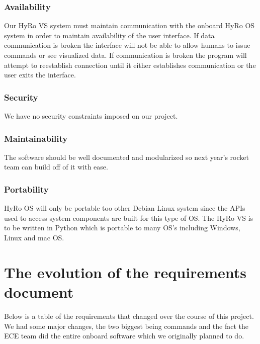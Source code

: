 \documentclass[10pt,draftclsnofoot,onecolumn,retainorgcmds]{IEEEtran}
\begin{document}
\subsubsection{Availability}
Our HyRo VS system must maintain communication with the onboard HyRo OS system in order to maintain availability of the user interface. If data communication is broken the interface will not be able to allow humans to issue commands or see visualized data. If communication is broken the program will attempt to reestablish connection until it either establishes communication or the user exits the interface.

\subsubsection{Security}
We have no security constraints imposed on our project.
\subsubsection{Maintainability} The software should be well documented and modularized so next year's rocket team can build off of it with ease.
\subsubsection{Portability} HyRo OS will only be portable too other Debian Linux system since the APIs used to access system components are built for this type of OS. The HyRo VS is to be written in Python which is portable to many OS's including Windows, Linux and mac OS.



\section{The evolution of the requirements document}
Below is a table of the requirements that changed over the course of this project. We had some major changes, the two biggest being commands and the fact the ECE team did the entire onboard software which we originally planned to do.
\end{document}
